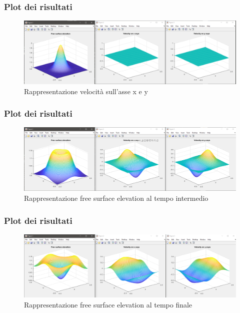 \documentclass{beamer}
\begin{document}
\begin{frame}
	\frametitle{Plot dei risultati }
	
	\begin{figure}
		\includegraphics[width=1.0\linewidth]{test_2_cpu_matrice_120_120_0000_0000}
		\caption{Rappresentazione velocità sull'asse x e y}
		\label{fig:Rappresentazione velocità sull'asse x e y}
	\end{figure}
	
\end{frame}


\begin{frame}
	\frametitle{Plot dei risultati }
	\begin{figure}
	\includegraphics[width=1.0\linewidth]{test_2_cpu_matrice_120_120_0003_0000}
	\caption{Rappresentazione free surface elevation al tempo intermedio}
	\label{fig:Rappresentazione free surface elevation al tempo intermedio}

	\end{figure}
\end{frame}
\begin{frame}
	\frametitle{Plot dei risultati }
	\begin{figure}
	\includegraphics[width=1.0\linewidth]{test_2_cpu_matrice_120_120_0008_0000}
	\caption{Rappresentazione free surface elevation al tempo finale}
	\label{fig:Rappresentazione free surface elevation al tempo finale}
	\end{figure}
\end{frame}
\end{document}
